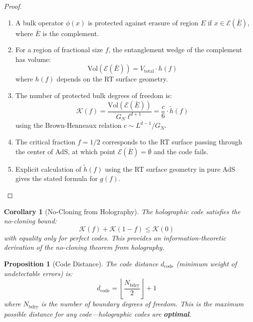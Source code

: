 \documentclass[12pt,a4paper]{article}
\newtheorem{proposition}[theorem]{Proposition}
\newtheorem{corollary}[theorem]{Corollary}
\begin{document}
\begin{proof}
\begin{enumerate}
    \item A bulk operator $\phi(x)$ is protected against erasure of region $E$ if $x \in \mathcal{E}(\bar{E})$, where $\bar{E}$ is the complement.
    
    \item For a region of fractional size $f$, the entanglement wedge of the complement has volume:
    \begin{equation}
    \text{Vol}(\mathcal{E}(\bar{E})) = V_{\text{total}} \cdot h(f)
    \end{equation}
    where $h(f)$ depends on the RT surface geometry.
    
    \item The number of protected bulk degrees of freedom is:
    \begin{equation}
    \mathcal{K}(f) = \frac{\text{Vol}(\mathcal{E}(\bar{E}))}{G_N \ell^{d+1}} = \frac{c}{6} \cdot \tilde{h}(f)
    \end{equation}
    using the Brown-Henneaux relation $c \sim L^{d-1}/G_N$.
    
    \item The critical fraction $f = 1/2$ corresponds to the RT surface passing through the center of AdS, at which point $\mathcal{E}(\bar{E}) = \emptyset$ and the code fails.
    
    \item Explicit calculation of $\tilde{h}(f)$ using the RT surface geometry in pure AdS gives the stated formula for $g(f)$.
\end{enumerate}
\end{proof}

\begin{corollary}[No-Cloning from Holography]
The holographic code satisfies the no-cloning bound:
\begin{equation}
\mathcal{K}(f) + \mathcal{K}(1-f) \leq \mathcal{K}(0)
\end{equation}
with equality only for perfect codes. This provides an information-theoretic derivation of the no-cloning theorem from holography.
\end{corollary}

\begin{proposition}[Code Distance]
The code distance $d_{\text{code}}$ (minimum weight of undetectable errors) is:
\begin{equation}
d_{\text{code}} = \left\lfloor \frac{N_{\text{bdry}}}{2} \right\rfloor + 1
\end{equation}
where $N_{\text{bdry}}$ is the number of boundary degrees of freedom. This is the maximum possible distance for any code---holographic codes are \textbf{optimal}.
\end{proposition}
\end{document}
